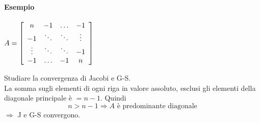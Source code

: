 \documentclass[10pt]{book}
\begin{document}
\paragraph{Esempio}
\begin{multicols}{2}
\begin{center}
$A = \left[\begin{array}{c c c c}
n & -1 & \ldots & -1\\
-1 & \ddots & \ddots & \vdots\\
\vdots & \ddots & \ddots & -1\\
-1 & \ldots & -1 & n
\end{array}\right]$
\end{center}
\columnbreak
Studiare la convergenza di Jacobi e G-S.\\
La somma sugli elementi di ogni riga in valore assoluto, esclusi gli elementi della diagonale principale è $= n-1$. Quindi
$$n > n-1 \Rightarrow A\text{ è predominante diagonale}$$
$\Rightarrow$ J e G-S convergono.
\end{multicols}
\pagebreak
\end{document}
